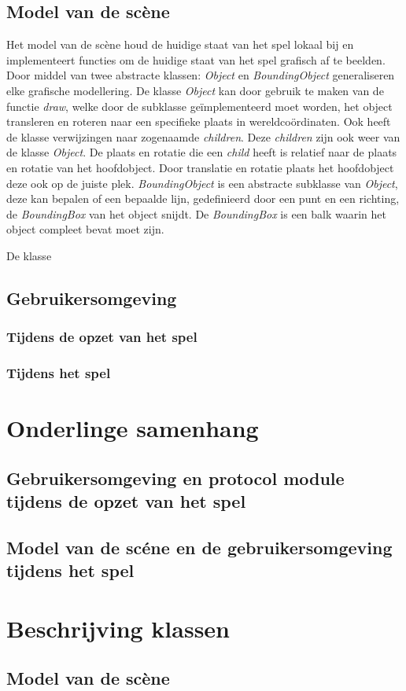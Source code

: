 \documentclass[a4paper,11pt]{article}
\begin{document}
    \subsection{Model van de sc\`ene}
    Het model van de sc\`ene houd de huidige staat van het spel lokaal bij en implementeert functies om de huidige staat van het spel grafisch af te beelden. Door middel van twee abstracte klassen: \emph{Object} en \emph{BoundingObject} generaliseren elke grafische modellering. De klasse \emph{Object} kan door gebruik te maken van de functie \emph{draw}, welke door de subklasse ge\"implementeerd moet worden, het object transleren en roteren naar een specifieke plaats in wereldco\"ordinaten. Ook heeft de klasse verwijzingen naar zogenaamde \emph{children}. Deze \emph{children} zijn ook weer van de klasse \emph{Object}. De plaats en rotatie die een \emph{child} heeft is relatief naar de plaats en rotatie van het hoofdobject. Door translatie en rotatie plaats het  hoofdobject deze ook op de juiste plek. \emph{BoundingObject} is een abstracte subklasse van \emph{Object}, deze kan bepalen of een bepaalde lijn, gedefinieerd door een punt en een richting, de \emph{BoundingBox} van het object snijdt. De \emph{BoundingBox} is een balk waarin het object compleet bevat moet zijn.
    
    De klasse 
    
    \subsection{Gebruikersomgeving}
    
    \subsubsection{Tijdens de opzet van het spel}
    
    \subsubsection{Tijdens het spel}
    
    \section{Onderlinge samenhang}
    
    \subsection{Gebruikersomgeving en protocol module tijdens de opzet van het spel}
    
    \subsection{Model van de sc\'ene en de gebruikersomgeving tijdens het spel}
    
    \section{Beschrijving klassen}
    
    \subsection{Model van de sc\`ene}
    
\end{document}
